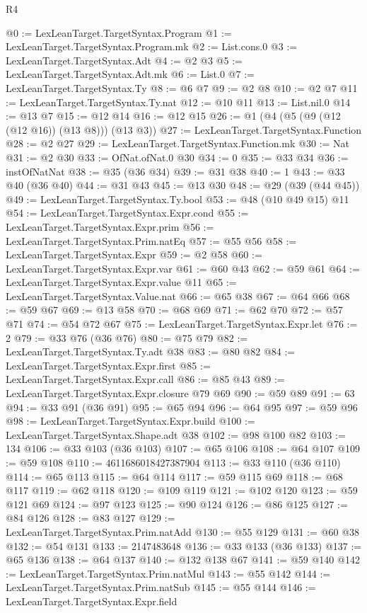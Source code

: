 \begin{lexlean}{R4}
\begin{coremodule}
@0 := LexLeanTarget.TargetSyntax.Program
@1 := LexLeanTarget.TargetSyntax.Program.mk
@2 := List.cons.{0}
@3 := LexLeanTarget.TargetSyntax.Adt
@4 := @2 @3
@5 := LexLeanTarget.TargetSyntax.Adt.mk
@6 := List.{0}
@7 := LexLeanTarget.TargetSyntax.Ty
@8 := @6 @7
@9 := @2 @8
@10 := @2 @7
@11 := LexLeanTarget.TargetSyntax.Ty.nat
@12 := @10 @11
@13 := List.nil.{0}
@14 := @13 @7
@15 := @12 @14
@16 := @12 @15
@26 := @1 (@4 (@5 (@9 (@12 (@12 @16)) (@13 @8))) (@13 @3))
@27 := LexLeanTarget.TargetSyntax.Function
@28 := @2 @27
@29 := LexLeanTarget.TargetSyntax.Function.mk
@30 := Nat
@31 := @2 @30
@33 := OfNat.ofNat.{0} @30
@34 := 0
@35 := @33 @34
@36 := instOfNatNat
@38 := @35 (@36 @34)
@39 := @31 @38
@40 := 1
@43 := @33 @40 (@36 @40)
@44 := @31 @43
@45 := @13 @30
@48 := @29 (@39 (@44 @45))
@49 := LexLeanTarget.TargetSyntax.Ty.bool
@53 := @48 (@10 @49 @15) @11
@54 := LexLeanTarget.TargetSyntax.Expr.cond
@55 := LexLeanTarget.TargetSyntax.Expr.prim
@56 := LexLeanTarget.TargetSyntax.Prim.natEq
@57 := @55 @56
@58 := LexLeanTarget.TargetSyntax.Expr
@59 := @2 @58
@60 := LexLeanTarget.TargetSyntax.Expr.var
@61 := @60 @43
@62 := @59 @61
@64 := LexLeanTarget.TargetSyntax.Expr.value @11
@65 := LexLeanTarget.TargetSyntax.Value.nat
@66 := @65 @38
@67 := @64 @66
@68 := @59 @67
@69 := @13 @58
@70 := @68 @69
@71 := @62 @70
@72 := @57 @71
@74 := @54 @72 @67
@75 := LexLeanTarget.TargetSyntax.Expr.let
@76 := 2
@79 := @33 @76 (@36 @76)
@80 := @75 @79
@82 := LexLeanTarget.TargetSyntax.Ty.adt @38
@83 := @80 @82
@84 := LexLeanTarget.TargetSyntax.Expr.first
@85 := LexLeanTarget.TargetSyntax.Expr.call
@86 := @85 @43
@89 := LexLeanTarget.TargetSyntax.Expr.closure @79 @69
@90 := @59 @89
@91 := 63
@94 := @33 @91 (@36 @91)
@95 := @65 @94
@96 := @64 @95
@97 := @59 @96
@98 := LexLeanTarget.TargetSyntax.Expr.build
@100 := LexLeanTarget.TargetSyntax.Shape.adt @38
@102 := @98 @100 @82
@103 := 134
@106 := @33 @103 (@36 @103)
@107 := @65 @106
@108 := @64 @107
@109 := @59 @108
@110 := 4611686018427387904
@113 := @33 @110 (@36 @110)
@114 := @65 @113
@115 := @64 @114
@117 := @59 @115 @69
@118 := @68 @117
@119 := @62 @118
@120 := @109 @119
@121 := @102 @120
@123 := @59 @121 @69
@124 := @97 @123
@125 := @90 @124
@126 := @86 @125
@127 := @84 @126
@128 := @83 @127
@129 := LexLeanTarget.TargetSyntax.Prim.natAdd
@130 := @55 @129
@131 := @60 @38
@132 := @54 @131
@133 := 2147483648
@136 := @33 @133 (@36 @133)
@137 := @65 @136
@138 := @64 @137
@140 := @132 @138 @67
@141 := @59 @140
@142 := LexLeanTarget.TargetSyntax.Prim.natMul
@143 := @55 @142
@144 := LexLeanTarget.TargetSyntax.Prim.natSub
@145 := @55 @144
@146 := LexLeanTarget.TargetSyntax.Expr.field

\end{coremodule}
\end{lexlean}
